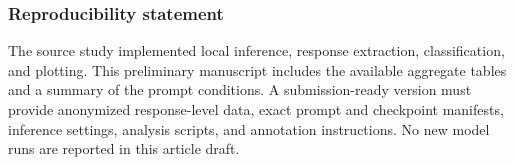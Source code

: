 \subsubsection*{Reproducibility statement}
The source study implemented local inference, response extraction, classification, and plotting. This preliminary manuscript includes the available aggregate tables and a summary of the prompt conditions. A submission-ready version must provide anonymized response-level data, exact prompt and checkpoint manifests, inference settings, analysis scripts, and annotation instructions. No new model runs are reported in this article draft.


